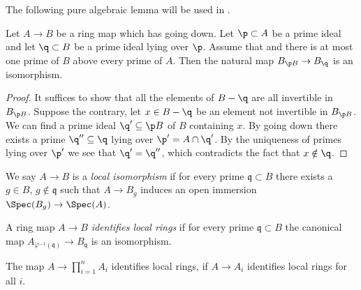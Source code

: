 The following pure algebraic lemma will be used in .

\begin{lemma}
  \label{thm:localization-isom-of-going-down}
  \leanok
  Let $A \to B$ be a ring map which has going down. Let $\p \subset A$ be a prime ideal and let 
  $\q \subset B$ be a prime ideal lying over $\p$. Assume that and there is at most one prime
  of $B$ above every prime of $A$. Then the natural map $B_{\p B} \to B_{\q}$ is an isomorphism.
\end{lemma}

\begin{proof}
  \leanok
  It suffices to show that all the elements of $B - \q$ are all invertible in $B_{\p B}$. Suppose the contrary, let $x \in B - \q$ be an element not invertible in $B_{\p B}$. We can find a prime ideal $\q' \subseteq \p B$ of $B$ containing $x$. By going down there exists a prime $\q'' \subseteq \q$ lying over $\p' = A \cap \q'$. By the uniqueness of primes lying over $\p'$ we see that $\q' = \q''$, which contradicts the fact that $x \notin \q$.
\end{proof}

\begin{definition}
  \label{def:local-isomorphism}
  \leanok
  We say $A \to B$ is a \emph{local isomorphism} if for every prime $\mathfrak{q} \subset B$ there exists a $g \in B$, $g \notin \mathfrak{q}$ such that $A \to B_g$ induces an open immersion $\Spec (B_g) \to \Spec (A)$.
\end{definition}

\begin{definition}
  A ring map $A \to B$ \emph{identifies local rings} if for every prime $\mathfrak{q} \subset B$ the canonical map $A_{\varphi^{-1}(\mathfrak{q})} \to B_{\mathfrak{q}}$ is an isomorphism.
  \label{def:identify-local-rings}
  \leanok
\end{definition}

\begin{lemma}
  \label{thm:finite-product-identifies-local-rings}
  \leanok
  The map \(A \to \prod_{i = 1}^{n} A_i \) identifies local rings, if \(A \to A_i\) identifies
  local rings for all \(i\).
\end{lemma}

